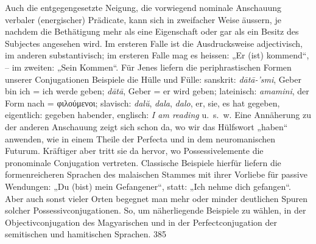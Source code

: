 Auch die entgegengesetzte Neigung, die vorwiegend nominale Anschauung verbaler (energischer) Prädicate, kann sich in zweifacher Weise äussern, je nachdem die Bethätigung mehr als eine Eigenschaft oder gar als ein Besitz des Subjectes angesehen wird. Im ersteren Falle ist die Ausdrucksweise adjectivisch, im anderen substantivisch; im ersteren Falle mag es heissen: „Er (ist) kommend“, – im zweiten: „Sein Kommen“. Für Jenes liefern die periphrastischen Formen unserer Conjugationen Beispiele die Hülle und Fülle: sanskrit: \textit{dātā-’smi}, Geber bin ich = ich werde geben; \textit{dātā}, Geber = er wird geben; lateinisch: \textit{amamini}, der Form nach = φιλούμενοι; slavisch: \textit{dalŭ}, \textit{dala}, \textit{dalo}, er, sie, es hat gegeben, eigentlich: gegeben habender, englisch: \textit{I am reading} u.~s.~w. Eine Annäherung zu der anderen Anschauung zeigt sich schon da, wo wir das Hülfswort „haben“ anwenden, wie in einem Theile der Perfecta und in dem neuromanischen Futurum. Kräftiger aber tritt sie da hervor, wo Possessivelemente die pronominale Conjugation vertreten. Classische Beispiele hierfür liefern die formenreicheren Sprachen des malaischen Stammes mit ihrer Vorliebe für passive Wendungen: „Du (bist) mein Gefangener“, statt: „Ich nehme dich gefangen“. Aber auch sonst vieler Orten begegnet man mehr oder minder deutlichen Spuren solcher Possessivconjugationen. So, um näherliegende Beispiele zu wählen, in der Objectivconjugation des Magyarischen und in der Perfectconjugation der semitischen und hamitischen Sprachen.  {\textbar}{\textbar}385{\textbar}{\textbar}\label{sp.385} 

